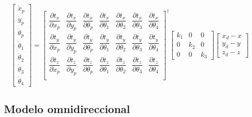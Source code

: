 \begin{equation*}
    \begin{bmatrix}
        \dot{x}_p \\
        \dot{y}_p \\
        \dot{\theta}_p \\
        \dot{\theta}_1 \\
        \dot{\theta}_2 \\
        \dot{\theta}_3 \\
        \dot{\theta}_4
    \end{bmatrix} =
    \begin{bmatrix}
        \dfrac{\partial t_x}{\partial x_p} & \dfrac{\partial t_x}{\partial y_p} & \dfrac{\partial t_x}{\partial \theta_p} & \dfrac{\partial t_x}{\partial \theta_1} & \dfrac{\partial t_x}{\partial \theta_2} & \dfrac{\partial t_x}{\partial \theta_3} & \dfrac{\partial t_x}{\partial \theta_4} \\
        \dfrac{\partial t_y}{\partial x_p} & \dfrac{\partial t_y}{\partial y_p} & \dfrac{\partial t_y}{\partial \theta_p} & \dfrac{\partial t_y}{\partial \theta_1} & \dfrac{\partial t_y}{\partial \theta_2} & \dfrac{\partial t_y}{\partial \theta_3} & \dfrac{\partial t_y}{\partial \theta_4} \\
        \dfrac{\partial t_z}{\partial x_p} & \dfrac{\partial t_z}{\partial y_p} & \dfrac{\partial t_z}{\partial \theta_p} & \dfrac{\partial t_z}{\partial \theta_1} & \dfrac{\partial t_z}{\partial \theta_2} & \dfrac{\partial t_z}{\partial \theta_3} & \dfrac{\partial t_z}{\partial \theta_4} \\
    \end{bmatrix}^\dagger
    \begin{bmatrix}
        k_1 & 0 & 0 \\
        0 & k_2 & 0 \\
        0 & 0 & k_3
    \end{bmatrix}
    \begin{bmatrix}
        x_d - x \\
        y_d - y \\
        z_d - z
    \end{bmatrix}
\end{equation*}

\subsection{Modelo omnidireccional}

